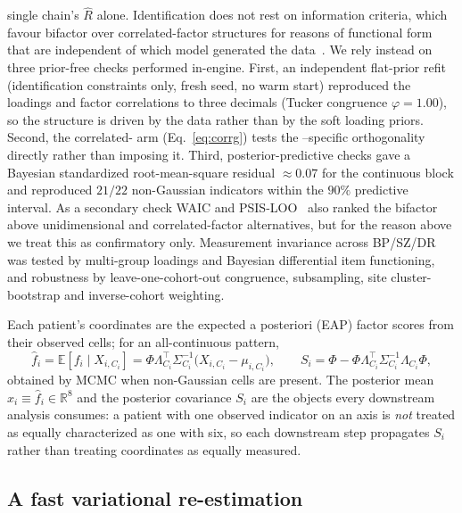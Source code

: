 single chain's $\hat R$ alone. Identification does not rest on information criteria, which favour bifactor over correlated-factor
structures for reasons of functional form that are independent of which model generated the
data~\citep{bonifaycai2017,greene2019fit,bonifay2017three}. We rely instead on three prior-free checks
performed in-engine. First, an independent flat-prior refit (identification constraints only, fresh seed, no
warm start) reproduced the loadings and factor correlations to three decimals (Tucker congruence
$\varphi=1.00$), so the structure is driven by the data rather than by the soft loading priors. Second, the
correlated-\Gfac{} arm (Eq.~\ref{eq:corrg}) tests the \Gfac{}--specific orthogonality directly rather than
imposing it. Third, posterior-predictive checks gave a Bayesian standardized root-mean-square residual
$\approx0.07$ for the continuous block and reproduced $21/22$ non-Gaussian indicators within the $90\%$
predictive interval. As a secondary check WAIC and PSIS-LOO~\citep{watanabe2010waic,vehtari2017loo} also
ranked the bifactor above unidimensional and correlated-factor alternatives, but for the reason above we
treat this as confirmatory only.  Measurement invariance across BP/SZ/DR was tested by multi-group loadings and
Bayesian differential item functioning, and robustness by leave-one-cohort-out congruence, subsampling, site cluster-bootstrap and inverse-cohort weighting.

Each patient's coordinates are the expected a posteriori (EAP) factor scores from their
observed cells; for an all-continuous pattern,
\begin{equation}
  \hat f_i=\mathbb E[f_i\mid X_{i,C_i}]
  =\Phi\Lambda_{C_i}^{\top}\Sigma_{C_i}^{-1}\!\big(X_{i,C_i}-\mu_{i,C_i}\big),\qquad
  S_i=\Phi-\Phi\Lambda_{C_i}^{\top}\Sigma_{C_i}^{-1}\Lambda_{C_i}\Phi ,
  \label{eq:m-scores}
\end{equation}
obtained by MCMC when non-Gaussian cells are present. The posterior mean
$x_i\equiv\hat f_i\in\mathbb R^{8}$ and the posterior covariance $S_i$ are the objects every
downstream analysis consumes: a patient with one observed indicator on an axis is \emph{not}
treated as equally characterized as one with six, so each downstream step propagates $S_i$
rather than treating coordinates as equally measured.

\subsection{A fast variational re-estimation}

